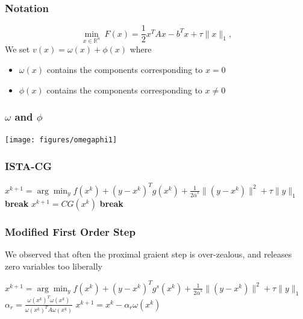 \documentclass{beamer}
\begin{document}
           
          
                                            
\begin{frame}
\frametitle{Notation}
	\begin{equation*}
		\min_{x \in \mathbb{R}^n} \ F(x) = \frac{1}{2}x^T A x - b^T x +\tau \|x\|_1 ,
	\end{equation*}
We set $v(x) = \omega(x) + \phi(x)$ where
\begin{itemize}
\item $\omega(x) $ contains the components corresponding to $x=0$ \\
\item $\phi(x) $ contains the components corresponding to $x \neq 0$ \\
\end{itemize}


\end{frame} 

\begin{frame}
	\frametitle{$\omega$ and $\phi$}
		\begin{center}
				\texttt{[image: figures/omegaphi1]}
		\end{center}	
\end{frame}


	\begin{frame}
		\frametitle{ISTA-CG}
	\begin{algorithmic}
		[1] \LOOP \STATE $x^{k+1} = \arg \min_y f(x^k) + (y-x^k)^T g(x^k) +\frac{1}{2 \bar{\alpha}^s}\| (y-x^k)\| ^2 + \tau \|y\|_1$
		 \LOOP {} \STATE \textbf{break} \ENDIF \STATE $x^{k+1} = CG(x^k) $
		 \STATE \textbf{break} \ENDIF \ENDLOOP \ENDLOOP 
	\end{algorithmic}

	\end{frame}
	


	\begin{frame}
		\frametitle{Modified First Order Step}
		We observed that often the proximal graient step is over-zealous, and releases zero variables too liberally
	\begin{algorithmic}
		[1] \STATE $x^{k+1} = \arg \min_y f(x^k) + (y-x^k)^T g^s(x^k) +\frac{1}{2 \bar{\alpha}^s}\| (y-x^k)\| ^2 + \tau \|y\|_1$ \ENDIF {} \STATE $\alpha_r = \frac{\omega(x^k)^T \omega(x^k)}{\omega(x^k)^T A\omega(x^k)}$ \STATE $x^{k+1} = x^k - \alpha_r \omega(x^k)$ \ENDIF
	\end{algorithmic}

	\end{frame}
	
\end{document}
